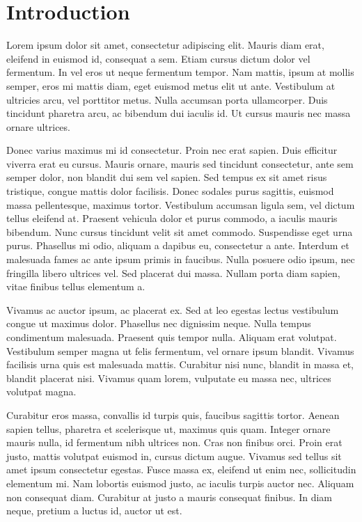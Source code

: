 \section{Introduction}
\label{sec:intro}

Lorem ipsum dolor sit amet, consectetur adipiscing elit. Mauris diam erat, eleifend in euismod id, consequat a sem. Etiam cursus dictum dolor vel fermentum. In vel eros ut neque fermentum tempor. Nam mattis, ipsum at mollis semper, eros mi mattis diam, eget euismod metus elit ut ante. Vestibulum at ultricies arcu, vel porttitor metus. Nulla accumsan porta ullamcorper. Duis tincidunt pharetra arcu, ac bibendum dui iaculis id. Ut cursus mauris nec massa ornare ultrices.

Donec varius maximus mi id consectetur. Proin nec erat sapien. Duis efficitur viverra erat eu cursus. Mauris ornare, mauris sed tincidunt consectetur, ante sem semper dolor, non blandit dui sem vel sapien. Sed tempus ex sit amet risus tristique, congue mattis dolor facilisis. Donec sodales purus sagittis, euismod massa pellentesque, maximus tortor. Vestibulum accumsan ligula sem, vel dictum tellus eleifend at. Praesent vehicula dolor et purus commodo, a iaculis mauris bibendum. Nunc cursus tincidunt velit sit amet commodo. Suspendisse eget urna purus. Phasellus mi odio, aliquam a dapibus eu, consectetur a ante. Interdum et malesuada fames ac ante ipsum primis in faucibus. Nulla posuere odio ipsum, nec fringilla libero ultrices vel. Sed placerat dui massa. Nullam porta diam sapien, vitae finibus tellus elementum a.

Vivamus ac auctor ipsum, ac placerat ex. Sed at leo egestas lectus vestibulum congue ut maximus dolor. Phasellus nec dignissim neque. Nulla tempus condimentum malesuada. Praesent quis tempor nulla. Aliquam erat volutpat. Vestibulum semper magna ut felis fermentum, vel ornare ipsum blandit. Vivamus facilisis urna quis est malesuada mattis. Curabitur nisi nunc, blandit in massa et, blandit placerat nisi. Vivamus quam lorem, vulputate eu massa nec, ultrices volutpat magna.

Curabitur eros massa, convallis id turpis quis, faucibus sagittis tortor. Aenean sapien tellus, pharetra et scelerisque ut, maximus quis quam. Integer ornare mauris nulla, id fermentum nibh ultrices non. Cras non finibus orci. Proin erat justo, mattis volutpat euismod in, cursus dictum augue. Vivamus sed tellus sit amet ipsum consectetur egestas. Fusce massa ex, eleifend ut enim nec, sollicitudin elementum mi. Nam lobortis euismod justo, ac iaculis turpis auctor nec. Aliquam non consequat diam. Curabitur at justo a mauris consequat finibus. In diam neque, pretium a luctus id, auctor ut est.

